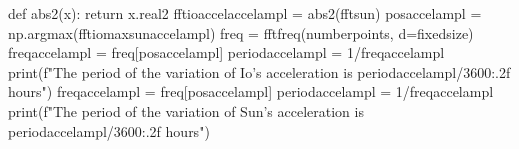 {}
\markdownRendererSectionEnd \markdownRendererSectionBegin
{}\markdownRendererInterblockSeparator
{}def abs2(x): return x.real2 fftioaccelaccelampl = abs2(fftsun) posaccelampl = np.argmax(fftiomaxsunaccelampl)\markdownRendererInterblockSeparator
{}
\markdownRendererSectionEnd \markdownRendererSectionBegin
{}\markdownRendererInterblockSeparator
{}
\markdownRendererSectionEnd \markdownRendererSectionBegin
{}\markdownRendererInterblockSeparator
{}
\markdownRendererSectionEnd \markdownRendererSectionBegin
{}\markdownRendererInterblockSeparator
{}
\markdownRendererSectionEnd \markdownRendererSectionBegin
{}\markdownRendererInterblockSeparator
{}freq = fftfreq(numberpoints, d=fixedsize)\markdownRendererInterblockSeparator
{}
\markdownRendererSectionEnd \markdownRendererSectionBegin
{}\markdownRendererInterblockSeparator
{}
\markdownRendererSectionEnd \markdownRendererSectionBegin
{}\markdownRendererInterblockSeparator
{}freqaccelampl = freq[posaccelampl] periodaccelampl = 1/freqaccelampl print(f"The period of the variation of Io's acceleration is {periodaccelampl/3600:.2f} hours") freqaccelampl = freq[posaccelampl] periodaccelampl = 1/freqaccelampl print(f"The period of the variation of Sun's acceleration is {periodaccelampl/3600:.2f} hours")\markdownRendererInterblockSeparator
